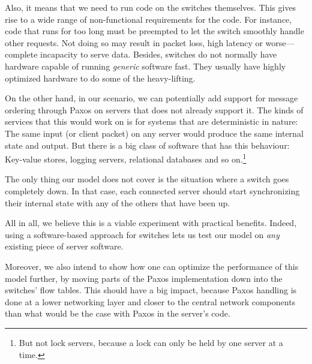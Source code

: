 Also, it means that we need to run code on the switches themselves. This
gives rise to a wide range of non-functional requirements for the code.
For instance, code that runs for too long must be
preempted to let the switch smoothly handle other
requests. Not doing so may result in packet loss, high latency or
worse---complete incapacity to serve data. Besides, switches do not normally
have hardware capable of running \textit{generic} software fast. They
usually have highly optimized hardware to do some of the heavy-lifting.

On the other hand, in our scenario, we can potentially add support for
message ordering through Paxos on servers that does not already support it.
The kinds of services that this would work on is for systems that are
deterministic in nature: The same input (or client packet) on any server
would produce the same internal state and output.
%
But there is a big class of software that has this behaviour:  Key-value
stores, logging servers, relational databases and so on.\footnote{But not
lock servers, because a lock can only be held by one server at a time.}

The only thing our model does not cover is the situation where a switch goes
completely down.
In that case, each connected server should start
synchronizing their internal state with any of the others that have been up.

All in all, we believe this is a viable experiment with practical benefits.
Indeed, using a software-based approach for switches lets us test our model
on \textit{any} existing piece of server software.

Moreover, we also intend to show how one can optimize the performance of
this model further, by moving parts of the Paxos implementation down into
the switches' flow tables.  This should have a big impact, because Paxos
handling is done at a lower networking layer and closer to the central network
components than what would be the case with Paxos in the server's code.


